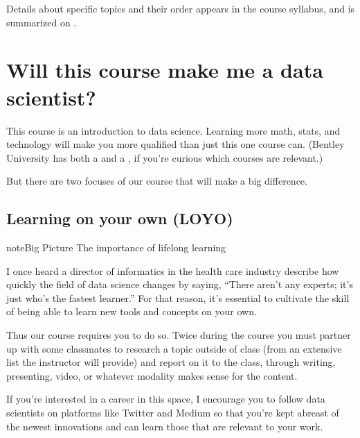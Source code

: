 \documentclass[letterpaper,10pt,english]{sphinxmanual}
\begin{document}
Details about specific topics and their order appears in the course syllabus, and is summarized on {\hyperref[\detokenize{intro::doc}]{}}.


\section{Will this course make me a data scientist?}
\label{\detokenize{chapter-1-intro-to-data-science:will-this-course-make-me-a-data-scientist}}
This course is an introduction to data science.  Learning more math, stats, and technology will make you more qualified than just this one course can.  (Bentley University has both a  and a , if you’re curious which courses are relevant.)

But there are two focuses of our course that will make a big difference.


\subsection{Learning on your own (LOYO)}
\label{\detokenize{chapter-1-intro-to-data-science:learning-on-your-own-loyo}}
\begin{sphinxadmonition}{note}{Big Picture \sphinxhyphen{} The importance of life\sphinxhyphen{}long learning}

I once heard a director of informatics in the health care industry describe how quickly the field of data science changes by saying, “There aren’t any experts; it’s just who’s the fastest learner.”  For that reason, it’s essential to cultivate the skill of being able to learn new tools and concepts on your own.
\end{sphinxadmonition}

Thus our course requires you to do so.  Twice during the course you must partner up with some classmates to research a topic outside of class (from an extensive list the instructor will provide) and report on it to the class, through writing, presenting, video, or whatever modality makes sense for the content.

If you’re interested in a career in this space, I encourage you to follow data scientists on platforms like Twitter and Medium so that you’re kept abreast of the newest innovations and can learn those that are relevant to your work.
\end{document}
